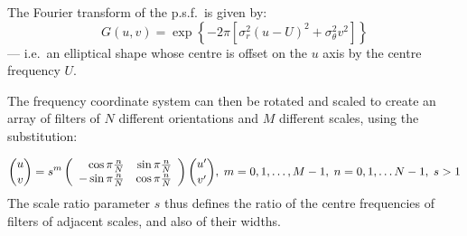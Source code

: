 \documentclass[12pt,a4]{article}
\begin{document}
The Fourier transform of the p.s.f.\ is given by:
\begin{equation}
  G(u,v) = \exp \left\{ -2\pi\left[ \sigma_r^2 (u-U)^2 +\sigma_\theta^2 v^2 \right] \right\}\label{eq:G}
\end{equation}
--- i.e.\ an elliptical shape whose centre is offset on the $u$ axis by the centre frequency $U$.

The frequency coordinate system can then be rotated and scaled to create an array of filters of $N$ different orientations and $M$ different scales, using the substitution:

\[ {u \choose v} = s^m \left( \begin{array}{rr}\cos \pi{n\over N} & \sin \pi{n\over N} \\ -\sin \pi{n\over N} & \cos \pi{n\over N} \end{array}\right) {u' \choose v'} ,\; m = 0, 1, \ldots, M-1,\; n = 0, 1, \ldots N-1,\; s > 1 \]
The scale ratio parameter $s$ thus defines the ratio of the centre frequencies of filters of adjacent scales, and also of their widths. 
\end{document}
